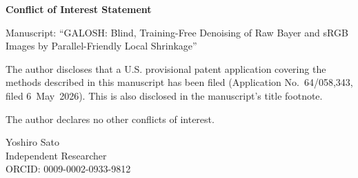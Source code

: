 \documentclass[11pt]{article}
\begin{document}
\begin{center}\textbf{Conflict of Interest Statement}\end{center}

\bigskip
Manuscript: ``GALOSH: Blind, Training-Free Denoising of Raw Bayer and sRGB
Images by Parallel-Friendly Local Shrinkage''

\bigskip
The author discloses that a U.S. provisional patent application covering the
methods described in this manuscript has been filed (Application
No.~64/058,343, filed 6~May~2026). This is also disclosed in the manuscript's
title footnote.

\bigskip
The author declares no other conflicts of interest.

\bigskip
Yoshiro Sato\\
Independent Researcher\\
ORCID: 0009-0002-0933-9812
\end{document}
